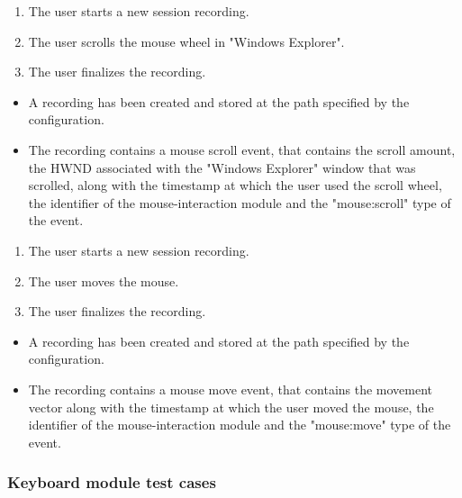 \begin{tests}
	{\begin{enumerate}
		\item The \gls{user} starts a new \gls{session} recording.
		\item The \gls{user} scrolls the mouse wheel in "Windows Explorer".
		\item The \gls{user} finalizes the recording.
	\end{enumerate}}
	{\begin{itemize}
		\item A recording has been created and stored at the path specified by the configuration.
		\item The recording contains a mouse scroll \gls{event},  that contains the scroll amount, the HWND associated with the "Windows Explorer" window that was scrolled, along with the timestamp at which the \gls{user} used the scroll wheel, the identifier of the mouse-interaction module and the "mouse:scroll" type of the event.
	\end{itemize}}
	
	{\begin{enumerate}
		\item The \gls{user} starts a new \gls{session} recording.
		\item The \gls{user} moves the mouse.
		\item The \gls{user} finalizes the recording.
	\end{enumerate}}
	{\begin{itemize}
		\item A recording has been created and stored at the path specified by the configuration.
		\item The recording contains a mouse move \gls{event},  that contains the movement vector along with the timestamp at which the \gls{user} moved the mouse, the identifier of the mouse-interaction module and the "mouse:move" type of the event.
	\end{itemize}}
\end{tests}

\subsubsection{Keyboard module test cases}

